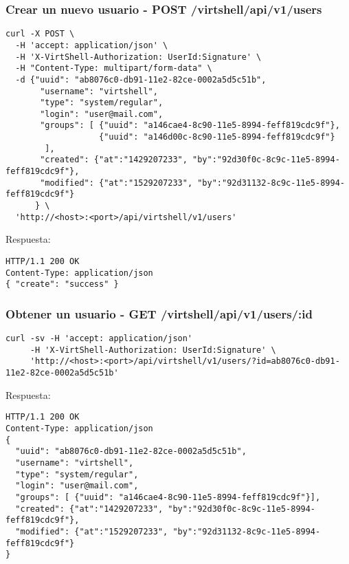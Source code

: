 \subsubsection{Crear un nuevo usuario - POST /virtshell/api/v1/users}

\begin{lstlisting}[style=json]
curl -X POST \
  -H 'accept: application/json' \
  -H 'X-VirtShell-Authorization: UserId:Signature' \
  -H "Content-Type: multipart/form-data" \
  -d {"uuid": "ab8076c0-db91-11e2-82ce-0002a5d5c51b",
       "username": "virtshell", 
       "type": "system/regular",
       "login": "user@mail.com",
       "groups": [ {"uuid": "a146cae4-8c90-11e5-8994-feff819cdc9f"},
                   {"uuid": "a146d00c-8c90-11e5-8994-feff819cdc9f"}
        ],
       "created": {"at":"1429207233", "by":"92d30f0c-8c9c-11e5-8994-feff819cdc9f"},
       "modified": {"at":"1529207233", "by":"92d31132-8c9c-11e5-8994-feff819cdc9f"}
      } \
  'http://<host>:<port>/api/virtshell/v1/users'
\end{lstlisting}

\vspace{1cm}
Respuesta:
\vspace{1cm}

\begin{lstlisting}[style=json]
HTTP/1.1 200 OK
Content-Type: application/json
{ "create": "success" }
\end{lstlisting}

\subsubsection{Obtener un usuario - GET /virtshell/api/v1/users/:id}

\begin{lstlisting}[style=json]
curl -sv -H 'accept: application/json' 
     -H 'X-VirtShell-Authorization: UserId:Signature' \ 
     'http://<host>:<port>/api/virtshell/v1/users/?id=ab8076c0-db91-11e2-82ce-0002a5d5c51b'
\end{lstlisting}

\vspace{1cm}
Respuesta:
\vspace{1cm}

\begin{lstlisting}[style=json]
HTTP/1.1 200 OK
Content-Type: application/json
{
  "uuid": "ab8076c0-db91-11e2-82ce-0002a5d5c51b",
  "username": "virtshell",
  "type": "system/regular",
  "login": "user@mail.com",
  "groups": [ {"uuid": "a146cae4-8c90-11e5-8994-feff819cdc9f"}],
  "created": {"at":"1429207233", "by":"92d30f0c-8c9c-11e5-8994-feff819cdc9f"},
  "modified": {"at":"1529207233", "by":"92d31132-8c9c-11e5-8994-feff819cdc9f"}
}
\end{lstlisting}

